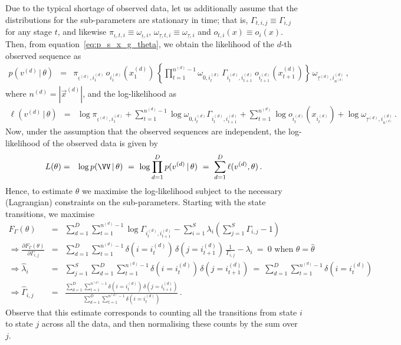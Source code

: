 \documentclass[a4paper]{article}
\begin{document}
Due to the typical shortage of observed data, let us additionally assume that the distributions for the sub-parameters are stationary in time; 
that is, $\Gamma_{t,i,j}\equiv\Gamma_{i,j}$ for any stage $t$, 
and likewise $\pi_{\underline{\iota},t,i}\equiv\omega_{\underline{\iota},i}$,
$\omega_{\underline{\tau},t,i}\equiv\omega_{\underline{\tau},i}$ and $o_{t,i}(x)\equiv o_{i}(x)$.
Then, from equation~\eqref{eq:p_s_x_g_theta}, we obtain the likelihood of the $d$-th observed sequence as
\begin{eqnarray}
  \!\!\!p(v^{(d)}\,|\,\theta) & = & 
   \pi_{\underline{\iota}^{(d)},i_1^{(d)}}\,o_{i_1^{(d)}}(x_1^{(d)})\,
\left\{\prod_{t=1}^{n^{(d)}-1}\omega_{0,i_t^{(d)}}\,\Gamma_{i_t^{(d)},i_{t+1}^{(d)}}\,o_{i_{t+1}^{(d)}}(x_{t+1}^{(d)})
\right\}\,\omega_{\underline{\tau}^{(d)},i^{(d)}_{n^{(d)}}}\,,
\end{eqnarray}
where $n^{(d)}=|\vec{x}^{(d)}|$, and the log-likelihood as
\begin{eqnarray}
  \ell(v^{(d)}\,|\,\theta) & = &
   \log\pi_{\underline{\iota}^{(d)},i_1^{(d)}}
 + \sum_{t=1}^{n^{(d)}-1}\log\omega_{0,i_t^{(d)}}\Gamma_{i_t^{(d)},i_{t+1}^{(d)}}
 + \sum_{t=1}^{n^{(d)}}\log o_{i_t^{(d)}}(x_{i_t^{(d)}})
 + \log\omega_{\underline{\tau}^{(d)},i_{n^{(d)}}^{(d)}}\,.
\label{eq:log-prob-d}
\end{eqnarray}
Now, under the assumption that the observed sequences are independent, the log-likelihood of the observed data is given by
\begin{eqnarray}
  L(\theta) & = & \log p(\VV\,|\,\theta)
~=~\log\prod_{d=1}^D p(v^{(d)}\,|\,\theta) 
~=~ \sum_{d=1}^D \ell(v^{(d)},\theta)
\,.
\end{eqnarray}
Hence, to estimate $\theta$ we maximise the log-likelihood subject to the necessary (Lagrangian) constraints on the sub-parameters.
Starting with the state transitions, we maximise
\begin{eqnarray}
  F_{\Gamma}(\theta) & = & \sum_{d=1}^D \sum_{t=1}^{n^{(d)}-1}\log\Gamma_{i_t^{(d)},i_{t+1}^{(d)}}
-\sum_{i=1}^{S}\lambda_i\left(\sum_{j=1}^{S}\Gamma_{i,j}-1\right)
\label{eq:F_gamma}
\\
  \Rightarrow \frac{\partial F_{\Gamma}(\theta)}{\partial\Gamma_{i,j}} & = &
\sum_{d=1}^D \sum_{t=1}^{n^{(d)}-1}\delta(i=i_t^{(d)})\,\delta(j=i_{t+1}^{(d)})\,\frac{1}{\Gamma_{i,j}}-\lambda_{i}
~=~0 \mbox{ when }\theta=\hat{\theta}
\nonumber\\
  \Rightarrow\hat{\lambda}_i & = & \sum_{j=1}^{S}\sum_{d=1}^D \sum_{t=1}^{n^{(d)}-1}\delta(i=i_t^{(d)})\,\delta(j=i_{t+1}^{(d)})
~=~\sum_{d=1}^D \sum_{t=1}^{n^{(d)}-1}\delta(i=i_t^{(d)})
\nonumber\\
  \Rightarrow\hat{\Gamma}_{i,j} & = & 
  \frac{\sum_{d=1}^D \sum_{t=1}^{n^{(d)}-1}\delta(i=i_t^{(d)})\,\delta(j=i_{t+1}^{(d)})}
          {\sum_{d=1}^D \sum_{t=1}^{n^{(d)}-1}\delta(i=i_t^{(d)})}\,.
\end{eqnarray}
Observe that this estimate corresponds to counting all the transitions from state $i$ to state $j$ across all the data, and then normalising these counts by the sum over $j$.
\end{document}
